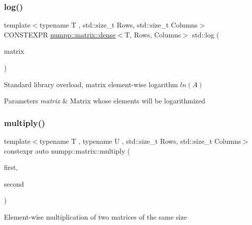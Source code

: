 \subsubsection{\texorpdfstring{log()}{log()}}
{\footnotesize\ttfamily template$<$typename T , std\+::size\+\_\+t Rows, std\+::size\+\_\+t Columns$>$ \\
C\+O\+N\+S\+T\+E\+X\+PR \hyperlink{classnumpp_1_1matrix_1_1dense}{numpp\+::matrix\+::dense}$<$T, Rows, Columns$>$ std\+::log (\begin{DoxyParamCaption}\item[{const \hyperlink{classnumpp_1_1matrix_1_1dense}{numpp\+::matrix\+::dense}$<$ T, Rows, Columns $>$ \&}]{matrix }\end{DoxyParamCaption})}

Standard library overload, matrix element-\/wise logarithm $ln(A)$


\begin{DoxyParams}{Parameters}
{\em matrix} & Matrix whose elements will be logarithmized\\
\hline
\end{DoxyParams}
\mbox{\label{group__numpp__structures__matrices__dense_gaeaace68ab41170931eb69e1cdb4fa381}} 
\subsubsection{\texorpdfstring{multiply()}{multiply()}}
{\footnotesize\ttfamily template$<$typename T , typename U , std\+::size\+\_\+t Rows, std\+::size\+\_\+t Columns$>$ \\
constexpr auto numpp\+::matrix\+::multiply (\begin{DoxyParamCaption}\item[{const \hyperlink{classnumpp_1_1matrix_1_1dense}{dense}$<$ T, Rows, Columns $>$ \&}]{first,  }\item[{const \hyperlink{classnumpp_1_1matrix_1_1dense}{dense}$<$ U, Rows, Columns $>$ \&}]{second }\end{DoxyParamCaption})}

Element-\/wise multiplication of two matrices of the same size\mbox{\label{group__numpp__structures__matrices__dense_ga9f59a9112db4704ed081eaf0c2b738b5}} 

